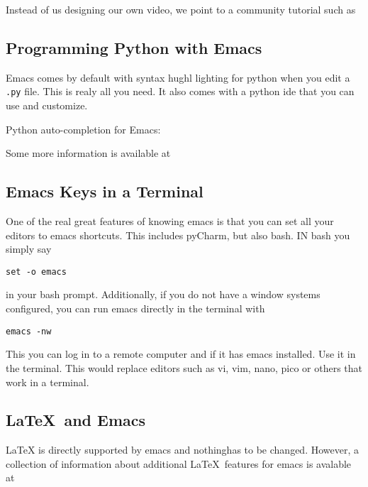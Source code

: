 Instead of us designing our own video, we point to a community
tutorial such as



\subsection{Programming Python with Emacs}

Emacs comes by default with syntax hughl lighting for python when you
edit a \verb|.py| file. This is realy all you need. It also comes with a
python ide that you can use and customize.

Python auto-completion for Emacs:



Some more information is available at


\subsection{Emacs Keys in a Terminal}

One of the real great features of knowing emacs is that you can set
all your editors to emacs shortcuts. This includes pyCharm, but also
bash. IN bash you simply say 

\begin{verbatim}
set -o emacs
\end{verbatim}

in your bash prompt. Additionally, if you do not have a window systems
configured, you can run emacs directly in the terminal with 

\begin{verbatim}
emacs -nw
\end{verbatim}

This you can log in to a remote computer and if it has emacs
installed. Use it in the terminal. This would replace editors such as
vi, vim, nano, pico or others that work in a terminal.

\subsection{\LaTeX~and Emacs}

LaTeX is directly supported by emacs and nothinghas to be
changed. However, a collection of information about additional
\LaTeX~features for emacs is avalable at

